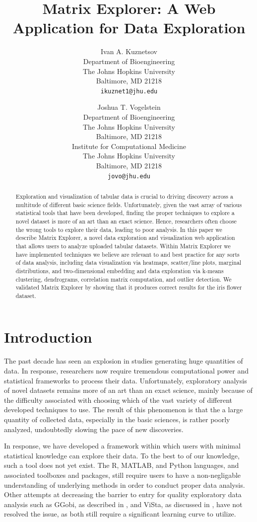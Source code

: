 \documentclass{article}
\title{Matrix Explorer: A Web Application for Data Exploration}
\author{
  Ivan A. Kuznetsov \\
  Department of Bioengineering \\
  The Johns Hopkins University\\
  Baltimore, MD 21218 \\
  \texttt{ikuznet1@jhu.edu} \\
  \and
  Joshua T. Vogelstein \\
  Department of Bioengineering \\
  The Johns Hopkins University \\
  Baltimore, MD 21218 \\
  Institute for Computational Medicine \\
  The Johns Hopkins University \\
  Baltimore, MD 21218 \\
  \texttt{jovo@jhu.edu}
}
\begin{document}

\maketitle

\begin{abstract}
  Exploration and visualization of tabular data is crucial to driving discovery across a multitude of different basic science fields. Unfortunately, given the vast array of various statistical tools that have been developed, finding the proper techniques to explore a novel dataset is more of an art than an exact science. Hence, researchers often choose the wrong tools to explore their data, leading to poor analysis. In this paper we describe Matrix Explorer, a novel data exploration and visualization web application that allows users to analyze uploaded tabular datasets. Within Matrix Explorer we have implemented techniques we believe are relevant to and best practice for any sorts of data analysis, including data visualization via heatmaps, scatter/line plots, marginal distributions, and two-dimensional embedding and data exploration via k-means clustering, dendrograms, correlation matrix computation, and outlier detection. We validated Matrix Explorer by showing that it produces correct results for the iris flower dataset.
\end{abstract}

\section{Introduction}
\label{sec:intro}

The past decade has seen an explosion in studies generating huge quantities of data. In response, researchers now require tremendous computational power and statistical frameworks to process their data. Unfortunately, exploratory analysis of novel datasets remains more of an art than an exact science, mainly because of the difficulty associated with choosing which of the vast variety of different developed techniques to use. The result of this phenomenon is that the a large quantity of collected data, especially in the basic sciences, is rather poorly analyzed, undoubtedly slowing the pace of new discoveries.

In response, we have developed a framework within which users with minimal statistical knowledge can explore their data. To the best to of our knowledge, such a tool does not yet exist. The R, MATLAB, and Python languages, and associated toolboxes and packages, still require users to have a non-negligable understanding of underlying methods in order to conduct proper data analysis. Other attempts at decreasing the barrier to entry for quality exploratory data analysis such as GGobi, as described in \cite{swayne2003ggobi}, and ViSta,  as discussed in \cite{valero2011using}, have not resolved the issue, as both still require a significant learning curve to utilize.
\end{document}
